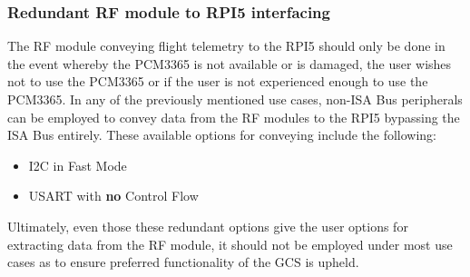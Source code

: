 \subsubsection{Redundant RF module to RPI5 interfacing}
The RF module conveying flight telemetry to the RPI5 should only be done in the event whereby the PCM3365 is not available or is damaged, the user wishes not to use the PCM3365 or if the user is not experienced enough to use the PCM3365. In any of the previously mentioned use cases, non-ISA Bus peripherals can be employed to convey data from the RF modules to the RPI5 bypassing the ISA Bus entirely. These available options for conveying include the following:
\begin{itemize}
    \item I2C in Fast Mode
    \item USART with \textbf{no} Control Flow
\end{itemize}
Ultimately, even those these redundant options give the user options for extracting data from the RF module, it should not be employed under most use cases as to ensure preferred functionality of the GCS is upheld. 
